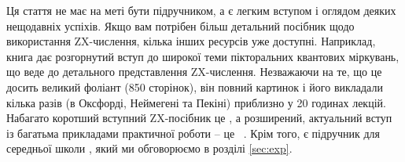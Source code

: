 \documentclass[11pt]{article}
\theoremstyle{definition}
\def\bR{\begin{color}{red}}
\def\e{\end{color}\xspace}
\newcommand{\TODOb}[1]{\marginpar{\scriptsize\bR \textbf{TODO:} #1\e}}
\begin{document}
Ця стаття не має на меті бути підручником, а є легким вступом і оглядом деяких нещодавніх успіхів.
Якщо вам потрібен більш детальний посібник щодо використання ZX-числення, кілька інших ресурсів уже доступні. Наприклад, книга \cite{CKbook} дає розгорнутий вступ до широкої теми пікторальних квантових міркувань, що веде до детального представлення ZX-числення. Незважаючи на те, що це досить великий фоліант (850 сторінок), він повний картинок і його викладали кілька разів (в Оксфорді, Неймегені та Пекіні) приблизно у 20 годинах лекцій. Набагато коротший вступний ZX-посібник це \cite{coecke2012tutorial}, а розширений, актуальний вступ із багатьма прикладами практичної роботи – це ~\cite{JohnSurvey}. Крім того, є підручник для середньої школи \cite{CoeckeGogioso2018}, який ми обговорюємо в розділі \ref{sec:exp}.

 
\end{document}
